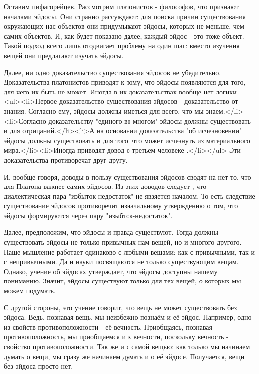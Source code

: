 \documentclass{article}
\begin{document}
Оставим пифагорейцев. Рассмотрим платонистов - философов, что признают началами эйдосы. Они странно рассуждают: для поиска причин существования окружающих нас объектов они придумывают эйдосы, которых не меньше, чем самих объектов. И, как будет показано далее, каждый эйдос - это тоже объект. Такой подход всего лишь отодвигает проблему на один шаг: вместо изучения вещей они предлагают изучать эйдосы.

Далее, ни одно доказательство существования эйдосов не убедительно. Доказательства платонистов приводят к тому, что эйдосы появляются для того, для чего их быть не может. Иногда в их доказательствах вообще нет логики. <ul><li>Первое доказательство существования эйдосов - доказательство от знания.
\footnotemark[1]
Согласно ему, эйдосы должны иметься для всего, что мы знаем.</li><li>Согласно доказательству "единого во многом"
\footnotemark[2]
эйдосы должны существовать и для отрицаний.</li><li>А на основании доказательства "об исчезновении"
\footnotemark[3]
эйдосы должны существовать и для того, что может исчезнуть из материального мира.</li><li>Иногда приводят довод о третьем человеке
\footnotemark[4]
.</li></ul> Эти доказательства противоречат друг другу.

И, вообще говоря, доводы в пользу существования эйдосов сводят на нет то, что для Платона важнее самих эйдосов. Из этих доводов следует
\footnotemark[5]
, что диалектическая пара "избыток-недостаток" не явзяется началом. То есть следствие существование эйдосов противоречит изначальному утверждению о том, что эйдосы формируются через пару "изыбток-недостаток".

Далее, предположим, что эйдосы и правда существуют. Тогда должны существовать эйдосы не только привычных нам вещей, но и многого другого. Наше мышление работает одинаково с любыми вещами: как с привычными, так и с непривычными. Да и науки посвящаются не только существующим вещам. Однако, учение об эйдосах утверждает, что эйдосы доступны нашему пониманию. Значит, эйдосы существуют только для тех вещей, о которых мы можем подумать.

С другой стороны, это учение говорит, что вещь не может существовать без эйдоса. Ведь, познавая вещь, мы неизбежно познаём и её эйдос. Например, одно из свойств противоположности - её вечность. Приобщаясь, познавая противоположность, мы приобщаемся и к вечности, поскольку вечность - свойство противоположности. Так же и с самой вещью: как только мы начинаем думать о вещи, мы сразу же начинаем думать и о её эйдосе. Получается, вещи без эйдоса просто нет.
\end{document}

